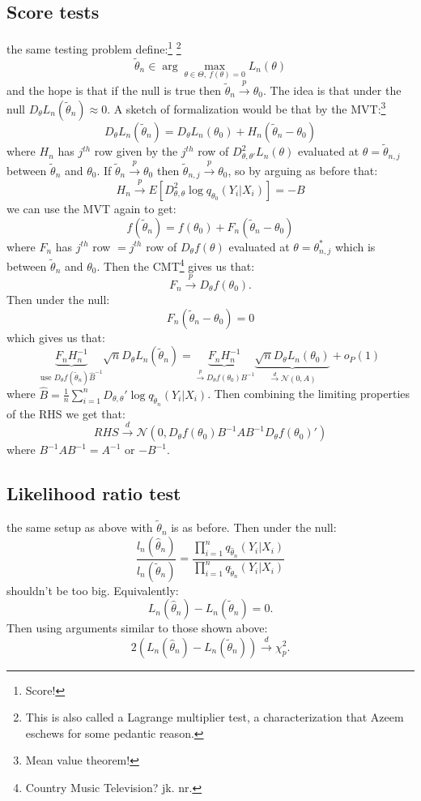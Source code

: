 \documentclass{tufte-book}
\theoremstyle{mytheoremstyle}
\theoremstyle{mylemstyle}
\theoremstyle{mydefstyle}
\begin{document}
\subsection{Score tests}
 the same testing problem define:\footnote{Score!} \footnote{This is also called a Lagrange multiplier test, a characterization that Azeem eschews for some pedantic reason.} 
	\[\tilde{\theta}_n \in \arg\max_{\theta \in \Theta,\ f(\theta) = 0} L_n(\theta)\]
and the hope is that if the null is true then \(\tilde{\theta}_n \overset{p}{\rightarrow} \theta_0\). The idea is that under the null \(D_\theta L_n(\tilde{\theta}_n) \approx 0\). A sketch of formalization would be that by the MVT:\footnote{Mean value theorem!}
	\[D_\theta L_n (\tilde{\theta}_n) = D_\theta L_n(\theta_0) + H_n(\tilde{\theta}_n - \theta_0)\]
where \(H_n\) has \(j^{th}\) row given by the \(j^{th}\) row of \(D_{\theta, \theta'}^2 L_n(\theta)\) evaluated at \(\theta = \tilde{\theta}_{n,j}\) between \(\tilde{\theta}_n\) and \(\theta_0\). If \(\tilde{\theta}_n \overset{p}{\rightarrow} \theta_0\) then \(\tilde{\theta}_{n,j} \overset{p}{\rightarrow} \theta_0\), so by arguing as before that:
	\[H_n \overset{p}{\rightarrow} E[D_{\theta,\theta}^2 \log q_{\theta_0}(Y_i|X_i)] = -B\]
we can use the MVT again to get:
	\[f(\tilde{\theta}_n) = f(\theta_0) + F_n(\tilde{\theta}_n - \theta_0)\]
where \(F_n\) has \(j^{th}\) row \(= j^{th}\) row of \(D_\theta f(\theta)\) evaluated at \(\theta = \theta^{*}_{n,j}\) which is between \(\tilde{\theta}_n\) and \(\theta_0\). Then the CMT\footnote{Country Music Television? jk. nr.} gives us that:
	\[F_n \overset{p}{\rightarrow} D_\theta f(\theta_0) \text{.}\]
Then under the null:
	\[F_n(\tilde{\theta}_n - \theta_0) = 0\]
which gives us that:
	\[\underbrace{F_n H_n^{-1}}_\textrm{use \(D_\theta f(\tilde{\theta}_n) \hat{B}^{-1}\)} \sqrt{n} D_{\theta} L_n(\tilde{\theta}_n) = \underbrace{F_n H_n^{-1}}_\textrm{\(\overset{p}{\rightarrow} D_\theta f(\theta_0) B^{-1}\)} \underbrace{\sqrt{n} D_\theta L_n(\theta_0)}_\textrm{\(\overset{d}{\rightarrow} \mathcal{N}(0, A)\)} + o_P(1)\]
where \(\hat{B} = \frac{1}{n} \sum_{i=1}^n D_{\theta,\theta}' \log q_{\tilde{\theta}_n} (Y_i|X_i)\). Then combining the limiting properties of the RHS we get that:
	\[RHS \overset{d}{\rightarrow} \mathcal{N}(0, D_\theta f(\theta_0) B^{-1} A B^{-1} D_\theta f(\theta_0)')\]
where \(B^{-1}AB^{-1} = A^{-1}\) or \(-B^{-1}\). 

\subsection{Likelihood ratio test}
 the same setup as above with \(\tilde{\theta}_n\) is as before. Then under the null:
	\[\frac{l_n(\hat{\theta}_n)}{l_n(\tilde{\theta}_n)} = \frac{\prod_{i=1}^n q_{\hat{\theta}_n} (Y_i|X_i)}{\prod_{i=1}^n q_{\tilde{\theta}_n}(Y_i | X_i)}\]
shouldn't be too big. Equivalently:
	\[L_n(\hat{\theta}_n) - L_n(\tilde{\theta}_n) = 0 \text{.}\]
Then using arguments similar to those shown above:
	\[2(L_n(\hat{\theta}_n) - L_n(\tilde{\theta}_n)) \overset{d}{\rightarrow} \chi_p^2 \text{.}\]
\end{document}
